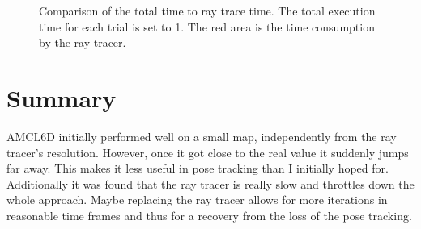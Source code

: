 \documentclass[Thesis.tex]{subfiles}
\begin{document}
\begin{figure}
\centering
{}
\caption[Ray tracer computation time]{Comparison of the total time to ray trace time. The total execution time for each trial is set to 1. The red area is the time consumption by the ray tracer.}
\label{fig:rttimebenchmark}
\end{figure}

\section{Summary}
\gls{AMCL6D} initially performed well on a small map, independently from the ray tracer's resolution. However, once it got close to the real value it suddenly jumps far away. This makes it less useful in pose tracking than I initially hoped for. Additionally it was found that the ray tracer is really slow and throttles down the whole approach. Maybe replacing the ray tracer allows for more iterations in reasonable time frames and thus for a recovery from the loss of the pose tracking.
\end{document}
